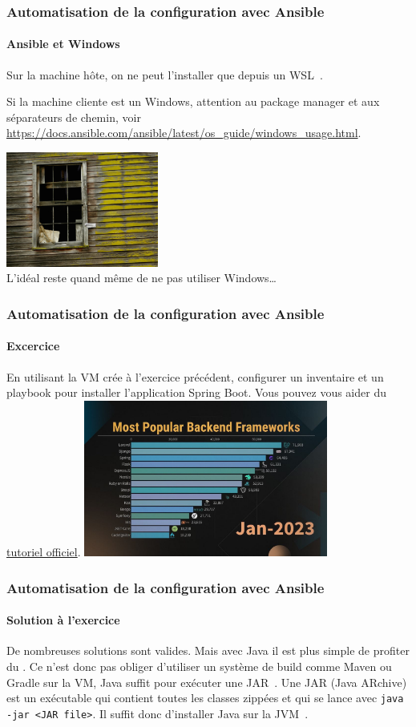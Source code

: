 \documentclass{beamer}
\begin{document}
    \begin{frame}
        \transdissolve
        \frametitle{Automatisation de la configuration avec Ansible}
        \framesubtitle{Ansible et Windows}
        Sur la machine hôte, on ne peut l'installer que depuis un WSL~.
        \begin{dangercolorbox}
            Si la machine cliente est un Windows, attention au package manager et aux séparateurs de chemin, voir \url{https://docs.ansible.com/ansible/latest/os_guide/windows_usage.html}.
        \end{dangercolorbox}
        \bigbreak
        \centering
        \includegraphics[width=5cm]{image/broken-windows} \\ L'idéal reste quand même de ne pas utiliser Windows\ldots \\
    \end{frame}

    \begin{frame}
        \transdissolve
        \frametitle{Automatisation de la configuration avec Ansible}
        \framesubtitle{Excercice}
        En utilisant la VM crée à l'exercice précédent, configurer un inventaire et un playbook pour installer l'application Spring Boot.
        \bigbreak
        Vous pouvez vous aider du \href{https://spring.io/guides/gs/spring-boot}{tutoriel officiel}.
        \bigbreak
        \centering
        \includegraphics[width=8cm]{image/most-popular-backend}
    \end{frame}

    \begin{frame}
        \transdissolve
        \frametitle{Automatisation de la configuration avec Ansible}
        \framesubtitle{Solution à l'exercice}
        De nombreuses solutions sont valides.
        Mais avec Java il est plus simple de profiter du .
        \bigbreak
        Ce n'est donc pas obliger d'utiliser un système de build comme Maven ou Gradle sur la VM, Java suffit pour exécuter une JAR~.
        \bigbreak
        Une JAR (Java ARchive) est un exécutable qui contient toutes les classes zippées et qui se lance avec \lstinline{java -jar <JAR file>}.
        Il suffit donc d'installer Java sur la JVM~.
    \end{frame}
\end{document}
